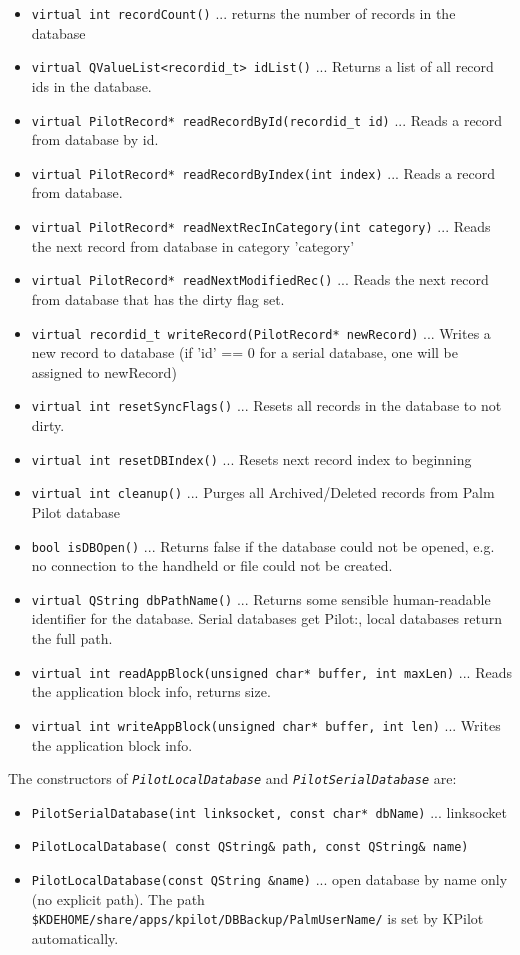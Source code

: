 \documentclass[10pt,a4paper]{article}
\newcommand{\code}[1]{{\small\texttt{#1}}}
\newcommand{\file}[1]{{\small\texttt{#1}}}
\newcommand{\class}[1]{{\small\em\texttt{#1}}}
\begin{document}
\begin{itemize}
\item\code{virtual int recordCount()} ... returns the number of records 
in the database
\item\code{virtual QValueList<recordid\_t> idList()} ... Returns a list 
of all record ids in the database.
\item\code{virtual PilotRecord* readRecordById(recordid\_t id)} ... Reads 
a record from database by id.
\item\code{virtual PilotRecord* readRecordByIndex(int index)} ... Reads a 
record from database.
\item\code{virtual PilotRecord* readNextRecInCategory(int category)} ... 
Reads the next record from database in category 'category'
\item\code{virtual PilotRecord* readNextModifiedRec()} ... Reads the next 
record from database that has the dirty flag set.
\item\code{virtual recordid\_t writeRecord(PilotRecord* newRecord)} ... Writes 
a new record to database (if 'id' == 0 for a serial database, one will be 
assigned to newRecord)
\item\code{virtual int resetSyncFlags()} ... Resets all records in the 
database to not dirty.
\item\code{virtual int resetDBIndex()} ... Resets next record index to beginning
\item\code{virtual int cleanup()} ... Purges all Archived/Deleted records 
from Palm Pilot database
\item\code{bool isDBOpen()} ... Returns false if the database could not be 
opened, e.g. no connection to the handheld or file could not be created.
\item\code{virtual QString dbPathName()} ... Returns some sensible human-readable 
identifier for the database. Serial databases get Pilot:, local databases 
return the full path.
\item\code{virtual int readAppBlock(unsigned char* buffer, int maxLen)} ... 
Reads the application block info, returns size.
\item\code{virtual int writeAppBlock(unsigned char* buffer, int len)} ... 
Writes the application block info.
\end{itemize}


The constructors of \class{PilotLocalDatabase} and \class{PilotSerialDatabase} are:
\begin{itemize}
\item\code{PilotSerialDatabase(int linksocket, const char* dbName)} ... linksocket
\item\code{PilotLocalDatabase( const QString\& path, const QString\& name)}
\item\code{PilotLocalDatabase(const QString \&name)} ... open database by name only
(no explicit path). The path \file{\$KDEHOME/share/apps/kpilot/DBBackup/PalmUserName/} 
is set by KPilot automatically.
\end{itemize}
\end{document}
